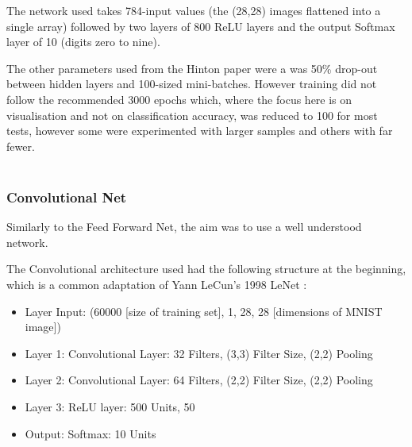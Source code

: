 \documentclass[a4paper,11pt,titlepage]{article}
\begin{document}
	\begin{figure}[H]
	\end{figure}

		\par 
		The network used takes 784-input values (the (28,28) images flattened into a single array) followed by two layers of 800 ReLU layers and the output Softmax layer of 10 (digits zero to nine). 
		\par 
		The other parameters used from the Hinton paper were a was 50\% drop-out between hidden layers and 100-sized mini-batches. However training did not follow the recommended 3000 epochs which, where the focus here is on visualisation and not on classification accuracy, was reduced to 100 for most tests, however some were experimented with larger samples and others with far fewer.
		\\\
		\subsubsection{Convolutional Net}
		\par
		Similarly to the Feed Forward Net, the aim was to use a well understood network. 
		\par 
		The Convolutional architecture used had the following structure at the beginning, which is a common adaptation of Yann LeCun's 1998 LeNet \cite{LeCun1998}: 
		\begin{itemize}
			\item Layer Input: (60000 [size of training set], 1, 28, 28 [dimensions of MNIST image])
			\item Layer 1: Convolutional Layer: 32 Filters, (3,3) Filter Size, (2,2) Pooling
			\item Layer 2: Convolutional Layer: 64 Filters, (2,2) Filter Size, (2,2) Pooling
			\item Layer 3: ReLU layer: 500 Units, 50%
			\item Output: Softmax: 10 Units
		\end{itemize}
		\par 
		
\end{document}
